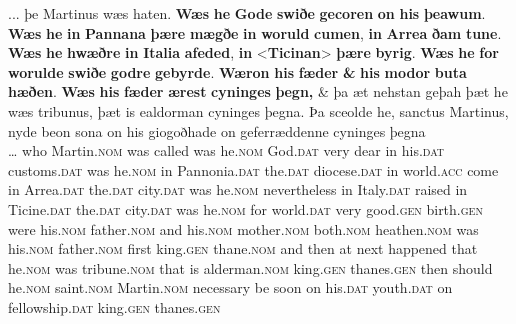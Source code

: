 \documentclass[output=paper,colorlinks,citecolor=brown]{langscibook}
\begin{document}
\ea%
\label{ex:cichosz:10}
\gll ... þe   Martinus   wæs   haten. \textbf{Wæs}   \textbf{he}     \textbf{Gode}     \textbf{swiðe} \textbf{gecoren}   \textbf{on}   \textbf{his}     \textbf{þeawum}.   \textbf{Wæs}   \textbf{he}     \textbf{in} \textbf{Pannana}   \textbf{þære}     \textbf{mægðe}     \textbf{in}   \textbf{woruld}   \textbf{cumen}, \textbf{in}   \textbf{Arrea}     \textbf{ðam}     \textbf{tune}.     \textbf{Wæs}   \textbf{he}     \textbf{hwæðre} \textbf{in}   \textbf{Italia}     \textbf{afeded},   \textbf{in}   <\textbf{Ticinan}>   \textbf{þære}     \textbf{byrig}. \textbf{Wæs}   \textbf{he}     \textbf{for}   \textbf{worulde}   \textbf{swiðe}   \textbf{godre}     \textbf{gebyrde}. \textbf{Wæron}   \textbf{his}     \textbf{fæder}     \textbf{\&} \textbf{his}     \textbf{modor} \textbf{buta}     \textbf{hæðen}.   \textbf{Wæs}   \textbf{his}     \textbf{fæder}     \textbf{ærest} \textbf{cyninges}   \textbf{þegn,}     \& þa   æt   nehstan   geþah þæt   he     wæs   tribunus,   þæt   is    ealdorman cyninges   þegna.     Þa   sceolde   he,     sanctus    Martinus,   nyde     beon   sona   on   his     giogoðhade    on   geferræddenne    cyninges   þegna \\
… who   Martin.\textsc{nom}  was   called   was   he.\textsc{nom}   God.\textsc{dat}   very dear     in   his.\textsc{dat}  customs.\textsc{dat}  was   he.\textsc{nom}   in Pannonia.\textsc{dat}  the.\textsc{dat}   diocese.\textsc{dat}  in   world.\textsc{acc}  come in   Arrea.\textsc{dat}   the.\textsc{dat}   city.\textsc{dat}  was   he.\textsc{nom}   nevertheless in   Italy.\textsc{dat}   raised    in  Ticine.\textsc{dat}  the.\textsc{dat}  city.\textsc{dat} was   he.\textsc{nom}   for   world.\textsc{dat}  very   good.\textsc{gen}   birth.\textsc{gen} were     his.\textsc{nom}   father.\textsc{nom}   and   his.\textsc{nom}   mother.\textsc{nom} both.\textsc{nom}   heathen.\textsc{nom}  was   his.\textsc{nom}   father.\textsc{nom}   first king.\textsc{gen}  thane.\textsc{nom}   and   then  at   next     happened that  he.\textsc{nom}  was   tribune.\textsc{nom}   that   is   alderman.\textsc{nom} king.\textsc{gen}   thanes.\textsc{gen}   then  should  he.\textsc{nom}  saint.\textsc{nom} Martin.\textsc{nom}   necessary  be  soon  on  his.\textsc{dat}  youth.\textsc{dat} on  fellowship.\textsc{dat} king.\textsc{gen}  thanes.\textsc{gen}\\
\end{document}
